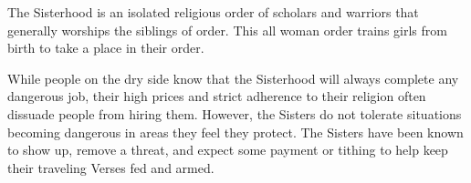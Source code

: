 The Sisterhood is an isolated religious order of scholars and warriors that generally worships the siblings of order.
This all woman order trains girls from birth to take a place in their order.

While people on the dry side know that the Sisterhood will always complete any dangerous job, their high prices and strict adherence to their religion often dissuade people from hiring them.
However, the Sisters do not tolerate situations becoming dangerous in areas they feel they protect.
The Sisters have been known to show up, remove a threat, and expect some payment or tithing to help keep their traveling Verses fed and armed.
